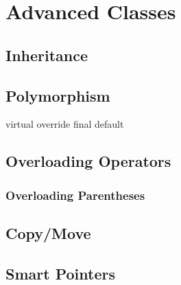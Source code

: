 \chapter{Advanced Classes}
\section{Inheritance}
\section{Polymorphism}
virtual
override
final
default
\section{Overloading Operators}
\subsection{Overloading Parentheses}
\label{functionobjects}
\section{Copy/Move}
\section{Smart Pointers}
